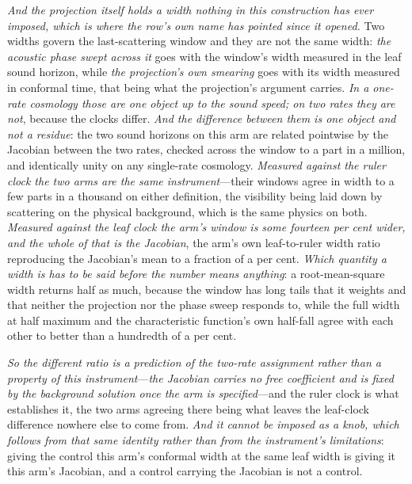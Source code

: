 \documentclass[11pt,a4paper]{article}
\theoremstyle{plain}
\theoremstyle{definition}
\theoremstyle{remark}
\begin{document}
\emph{And the projection itself holds a width nothing in this construction has ever imposed, which is where
the row's own name has pointed since it opened.} Two widths govern the last-scattering window and they are
not the same width: \emph{the acoustic phase swept across it} goes with the window's width measured in the
leaf sound horizon, while \emph{the projection's own smearing} goes with its width measured in conformal
time, that being what the projection's argument carries. \emph{In a one-rate cosmology those are one object
up to the sound speed; on two rates they are not}, because the clocks differ. \emph{And the difference between them is one object and not a residue}: the two sound horizons on this
arm are related pointwise by the Jacobian between the two rates, checked across the window to a part in a
million, and identically unity on any single-rate cosmology. \emph{Measured against the ruler clock the two
arms are the same instrument}---their windows agree in width to a few parts in a thousand on either
definition, the visibility being laid down by scattering on the physical background, which is the same
physics on both. \emph{Measured against the leaf clock the arm's window is some fourteen per cent wider, and
the whole of that is the Jacobian}, the arm's own leaf-to-ruler width ratio reproducing the Jacobian's mean
to a fraction of a per cent. \emph{Which quantity a width is has to be said before the number means
anything}: a root-mean-square width returns half as much, because the window has long tails that it weights
and that neither the projection nor the phase sweep responds to, while the full width at half maximum and the
characteristic function's own half-fall agree with each other to better than a hundredth of a per cent.

\emph{So the different ratio is a prediction of the two-rate assignment rather than a property of this
instrument}---\emph{the Jacobian carries no free coefficient and is fixed by the background solution once the
arm is specified}---and the ruler clock is what establishes it, the two arms agreeing there being what leaves
the leaf-clock difference nowhere else to come from. \emph{And it cannot be imposed as a knob, which follows
from that same identity rather than from the instrument's limitations}: giving the control this arm's
conformal width at the same leaf width is giving it this arm's Jacobian, and a control carrying the Jacobian
is not a control.
\end{document}

